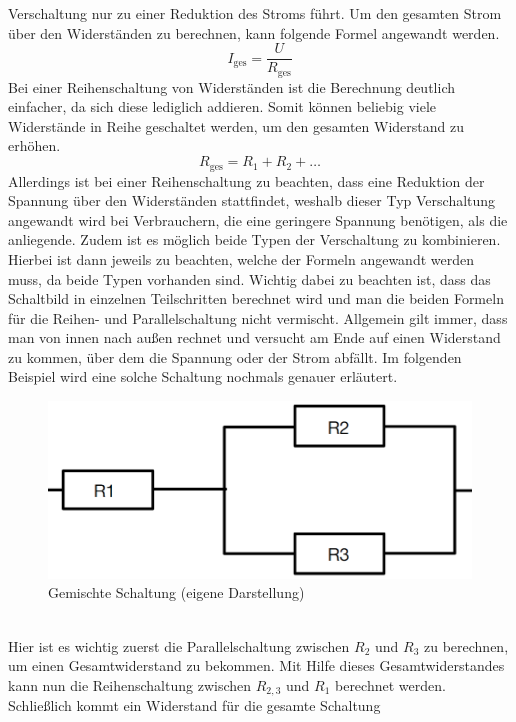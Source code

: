 Verschaltung nur zu einer Reduktion des Stroms führt. Um den gesamten Strom über den Widerständen zu berechnen, kann folgende Formel angewandt werden.
\begin{equation}
I_{\text{ges}} = \frac{U}{R_{\text{ges}}}
\label{eqn:Gesamtstrom Parallelschaltung}
\end{equation}
Bei einer Reihenschaltung von Widerständen ist die Berechnung deutlich einfacher, da sich diese lediglich addieren. Somit können beliebig viele Widerstände in 
Reihe geschaltet werden, um den gesamten Widerstand zu erhöhen.
\begin{equation}
R_{\text{ges}}=R_1+R_2+\dots
\label{eqn:Widerstand Reihenschaltung}
\end{equation}
Allerdings ist bei einer Reihenschaltung zu beachten, dass eine Reduktion der Spannung über den Widerständen stattfindet, weshalb dieser Typ Verschaltung 
angewandt wird bei Verbrauchern, die eine geringere Spannung benötigen, als die anliegende. Zudem ist es möglich beide Typen der Verschaltung zu kombinieren. 
Hierbei ist dann jeweils zu beachten, welche der Formeln angewandt werden muss, da beide Typen vorhanden sind. Wichtig dabei zu beachten ist, dass das 
Schaltbild in einzelnen Teilschritten berechnet wird und man die beiden Formeln für die Reihen- und Parallelschaltung nicht vermischt.
Allgemein gilt immer, dass man von innen nach außen rechnet und versucht am Ende auf einen Widerstand zu kommen, über dem die Spannung oder der Strom abfällt.
Im folgenden Beispiel wird eine solche Schaltung nochmals genauer erläutert.
\begin{figure}[hbt]
    \centering
    \includegraphics[width=0.8\linewidth]{images/Gemischte Schaltung}
    \caption[Gemischte Schaltung]{Gemischte Schaltung (eigene Darstellung)}
    \label{fig:Gemischte Schaltung}
\end{figure}
\\Hier ist es wichtig zuerst die Parallelschaltung zwischen $R_2$ und $R_3$ zu berechnen, um einen Gesamtwiderstand zu bekommen. Mit Hilfe dieses 
Gesamtwiderstandes kann nun die Reihenschaltung zwischen $R_{2,3}$ und $R_1$ berechnet werden. Schließlich kommt ein Widerstand für die gesamte Schaltung
